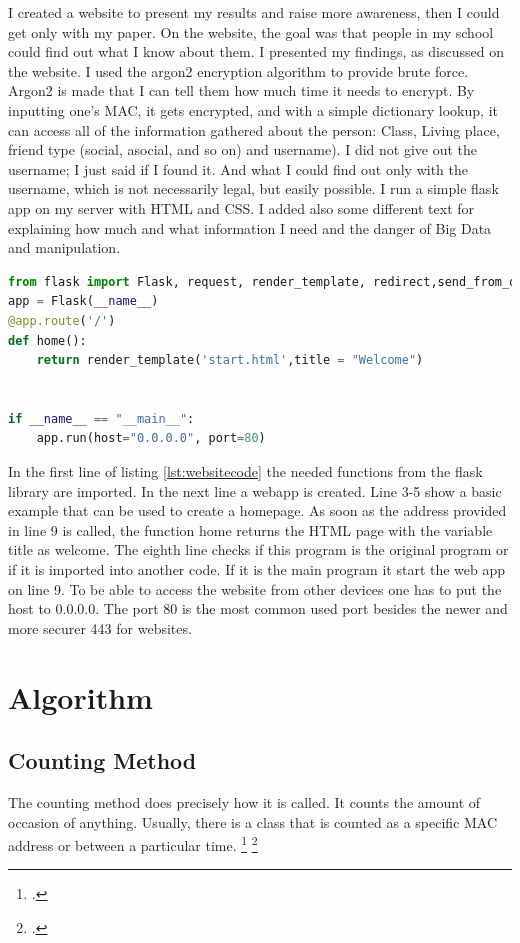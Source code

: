 \documentclass[11pt]{article}
\begin{document}
I created a website to present my results and raise more awareness, then I could get only with my paper. On the website, the goal was that people in my school could find out what I know about them. I presented my findings, as discussed on the website. I used the argon2 encryption algorithm to provide brute force. Argon2 is made that I can tell them how much time it needs to encrypt. By inputting one's MAC, it gets encrypted, and with a simple dictionary lookup, it can access all of the information gathered about the person: Class, Living place, friend type (social, asocial, and so on) and username). I did not give out the username; I just said if I found it. And what I could find out only with the username, which is not necessarily legal, but easily possible.
I run a simple flask app on my server with HTML and CSS. I added also some different text for explaining how much and what information I need and the danger of Big Data and manipulation.
\begin{lstlisting}[language=Python,caption="Website sample code",style=python,label=lst:websitecode]
from flask import Flask, request, render_template, redirect,send_from_directory
app = Flask(__name__)
@app.route('/')
def home():
    return render_template('start.html',title = "Welcome")


if __name__ == "__main__":
    app.run(host="0.0.0.0", port=80)
\end{lstlisting}
In the first line of listing \ref{lst:websitecode} the needed functions from the flask library are imported. In the next line a webapp is created. Line 3-5 show a basic example that can be used to create a homepage. As soon as the address provided in line 9 is called, the function home returns the HTML page with the variable title as welcome.
The eighth line checks if this program is the original program or if it is imported into another code. If it is the main program it start the web app on line 9. To be able to access the website from other devices one has to put the host to 0.0.0.0. The port 80 is the most common used port besides the newer and more securer 443 for websites.

\section{Algorithm}
\subsection{Counting Method}
The counting method does precisely how it is called. It counts the amount of occasion of anything. Usually, there is a class that is counted as a specific MAC address or between a particular time.
\footcite{datasciencefromscratch}
\footcite[P. 289]{dataalgorithms}
\end{document}
